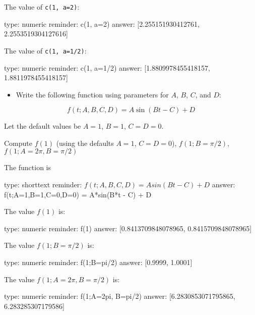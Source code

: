 \documentclass[12pt]{article}
\begin{document}
The value of \texttt{c(1, a=2)}:

\begin{answer}
    type: numeric
    reminder: c(1, a=2)
    answer: [2.255151930412761, 2.2553519304127616]

\end{answer}

The value of \texttt{c(1, a=1/2)}:

\begin{answer}
    type: numeric
    reminder: c(1, a=1/2)
    answer: [1.8809978455418157, 1.8811978455418157]

\end{answer}

\begin{itemize}
\itemsep1pt\parskip0pt
\item
  Write the following function using parameters for $A$, $B$, $C$, and
  $D$:
\end{itemize}

\[
f(t;A,B,C,D) = A\sin(Bt - C) + D
\]

Let the default values be $A=1$, $B=1$, $C=D=0$.

Compute $f(1)$ (using the defaults $A=1$, $C=D=0$), $f(1; B=\pi/2)$,
$f(1; A=2\pi, B=\pi/2)$

The function is

\begin{answer}
type: shorttext
reminder: \(f(t;A,B,C,D) = Asin(Bt - C) + D \)
answer: f(t;A=1,B=1,C=0,D=0) = A*sin(B*t - C) + D

\end{answer}

The value $f(1)$ is:

\begin{answer}
    type: numeric
    reminder: f(1)
    answer: [0.8413709848078965, 0.8415709848078965]

\end{answer}

The value $f(1; B=\pi/2)$ is:

\begin{answer}
    type: numeric
    reminder: f(1;B=pi/2)
    answer: [0.9999, 1.0001]

\end{answer}

The value $f(1; A=2\pi, B=\pi/2)$ is:

\begin{answer}
    type: numeric
    reminder: f(1;A=2pi, B=pi/2)
    answer: [6.2830853071795865, 6.283285307179586]

\end{answer}
\end{document}
